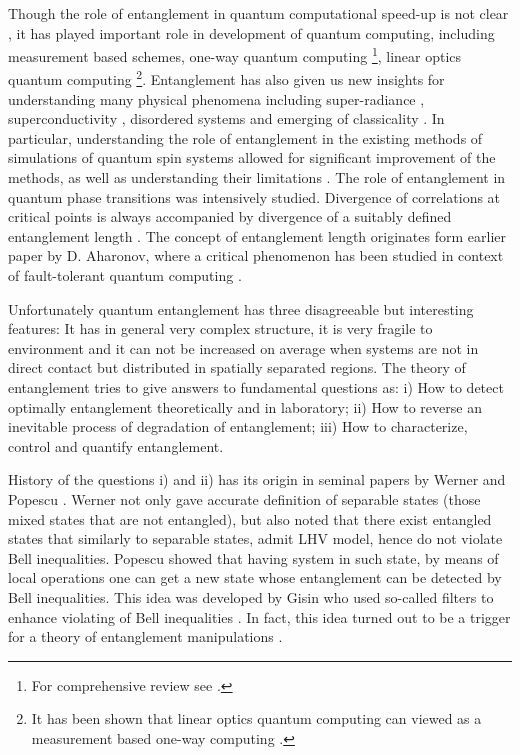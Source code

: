 \documentclass[rmp,12pt,preprint]{revtex4-2}
\begin{document}
Though the role of entanglement in quantum computational speed-up is
not clear \cite {KendonM2006}, it has played important role in development of quantum
computing, including measurement based schemes, one-way quantum
computing \cite{RaussendorfBriegelOneWay}\footnote{For comprehensive
  review see \cite {BrowneB}.}, linear optics quantum computing
\cite{KnillLM2001-lin-opt}\footnote{It has been shown that
  linear optics quantum computing can viewed as a measurement based
  one-way computing \cite{popescu-2006}.}. Entanglement has also given
us new insights for understanding many physical phenomena including
super-radiance \cite {Lambert}, superconductivity \cite{Vedral},
disordered systems \cite {DurHHLB} and emerging of classicality
\cite{Zurek03}. In particular, understanding the role of entanglement
in the existing methods of simulations of quantum spin systems allowed
for significant improvement of the methods, as well as understanding
their limitations \cite{Vidal,Vidal1,Verstraete,AndreasPD}. The role
of entanglement in quantum phase transitions
\cite{LarssonJ,OsborneN,Osterloh,Latorre,Rico,VerstraetePC2003-locent}
was intensively studied. Divergence of correlations at critical points
is always accompanied by divergence of a suitably defined entanglement
length \cite{VerstraetePC2003-locent}. The concept of entanglement
length originates form earlier paper by D. Aharonov, where a critical
phenomenon has been studied in context of fault-tolerant quantum
computing \cite{dorit-phase}.


Unfortunately quantum entanglement has three disagreeable but
interesting features: It has in general very complex structure, it is
very fragile to environment and it can not be increased on average
when systems are not in direct contact but distributed in spatially
separated regions. The theory of entanglement tries to give answers to
fundamental questions as: i) How to detect optimally entanglement
theoretically and in laboratory; ii) How to reverse an inevitable
process of degradation of entanglement; iii) How to characterize,
control and quantify entanglement.

History of the questions i) and ii) has its origin in seminal papers
by Werner and Popescu \cite {Werner1989,Popescu2}. Werner not only gave
accurate definition of separable states (those mixed states that are
not entangled), but also noted that there exist entangled states that
similarly to separable states, admit LHV model, hence do not violate
Bell inequalities. Popescu showed \cite{Popescu2} that having system
in such state, by means of local operations one can get a new state
whose entanglement can be detected by Bell inequalities. This idea was
developed by Gisin who used so-called filters to enhance violating of
Bell inequalities \cite {Gisin96}. In fact, this idea turned out to be
a trigger for a theory of entanglement manipulations
\cite{BBPSSW1996}.
\end{document}
